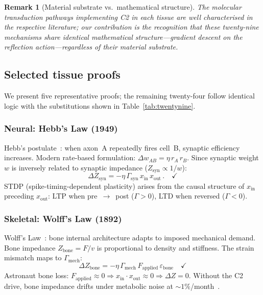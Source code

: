 \documentclass[aps,pre,twocolumn,superscriptaddress,floatfix]{revtex4-2}
\newtheorem{remark}{Remark}
\begin{document}
\begin{remark}[Material substrate vs.\ mathematical structure]
\label{rem:substrate-vs-structure}
The molecular transduction pathways implementing C2 in each
tissue are well characterised in the respective
literature; our contribution is the recognition that
these twenty-nine mechanisms share \emph{identical
mathematical structure}---gradient descent on the
reflection action---regardless of their material substrate.
\end{remark}

\subsection{Selected tissue proofs}

We present five representative proofs; the remaining
twenty-four follow identical logic with the substitutions
shown in Table~\ref{tab:twentynine}.

\subsubsection{Neural: Hebb's Law (1949)}

Hebb's postulate~\cite{Hebb1949}: when axon~A repeatedly
fires cell~B, synaptic efficiency increases.
Modern rate-based formulation:
$\Delta w_{AB} = \eta\,r_A\,r_B$.
Since synaptic weight $w$ is inversely related to
synaptic impedance ($Z_{\text{syn}} \propto 1/w$):
\begin{equation}
  \Delta Z_{\text{syn}}
  = -\eta\,\Gamma_{\text{syn}}\,
    x_{\text{in}}\,x_{\text{out}}\,.
  \quad \checkmark
  \label{eq:hebb-C2}
\end{equation}
STDP (spike-timing-dependent plasticity) arises from
the causal structure of $x_{\text{in}}$ preceding
$x_{\text{out}}$: LTP when pre~$\to$~post ($\Gamma > 0$),
LTD when reversed ($\Gamma < 0$).

\subsubsection{Skeletal: Wolff's Law (1892)}

Wolff's Law~\cite{Wolff1892}: bone internal architecture
adapts to imposed mechanical demand.
Bone impedance $Z_{\text{bone}} = F/v$ is proportional
to density and stiffness.  The strain mismatch maps
to $\Gamma_{\text{mech}}$:
\begin{equation}
  \Delta Z_{\text{bone}}
  = -\eta\,\Gamma_{\text{mech}}\,
    F_{\text{applied}}\,\varepsilon_{\text{bone}}
  \quad \checkmark
  \label{eq:wolff-C2}
\end{equation}
Astronaut bone loss: $F_{\text{applied}} \approx 0
\Rightarrow x_{\text{in}} \cdot x_{\text{out}} \approx 0
\Rightarrow \Delta Z = 0$.
Without the C2 drive, bone impedance drifts
under metabolic noise at $\sim 1\%$/month~\cite{Lang2004}.
\end{document}
